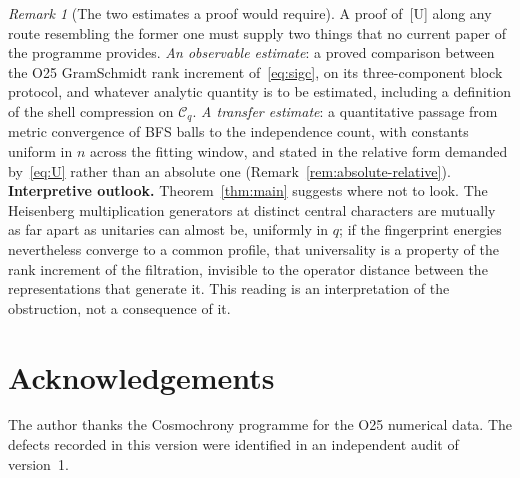 \documentclass[12pt,a4paper]{article}
\theoremstyle{definition}
\theoremstyle{remark}
\newtheorem{remark}[theorem]{Remark}
\newcommand{\Cq}{\mathcal{C}_q}
\begin{document}
    \begin{remark}[The two estimates a proof would require]\label{rem:route}
      A proof of~[U] along any route resembling the former one must supply two things that no
      current paper of the programme provides.
      \emph{An observable estimate}: a proved comparison between the O25
      Gram\textendash Schmidt rank increment of~\eqref{eq:sigc}, on its three-component
      block protocol, and whatever analytic quantity is to be estimated, including a
      definition of the shell compression on $\Cq$.
      \emph{A transfer estimate}: a quantitative passage from metric convergence of BFS balls
      to the independence count, with constants uniform in $n$ across the fitting window, and
      stated in the relative form demanded by~\eqref{eq:U} rather than an absolute one
      (Remark~\ref{rem:absolute-relative}).
      \textbf{Interpretive outlook.}
      Theorem~\ref{thm:main} suggests where not to look.
      The Heisenberg multiplication generators at distinct central characters are
      mutually as far apart as
      unitaries can almost be, uniformly in $q$; if the fingerprint energies nevertheless
      converge to a common profile, that universality is a property of the rank increment of
      the filtration, invisible to the operator distance between the representations that
      generate it.
      This reading is an interpretation of the obstruction, not a consequence of it.
    \end{remark}

  \section*{Acknowledgements}

    The author thanks the Cosmochrony programme for the O25 numerical data.
    The defects recorded in this version were identified in an independent audit of
    version~1.

    \clearpage
      
\end{document}
